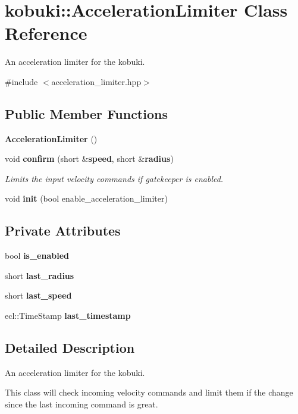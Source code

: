 \section{kobuki\-:\-:\-Acceleration\-Limiter \-Class \-Reference}
\label{classkobuki_1_1AccelerationLimiter}


\-An acceleration limiter for the kobuki.  




{\ttfamily \#include $<$acceleration\-\_\-limiter.\-hpp$>$}

\subsection*{\-Public \-Member \-Functions}
\begin{DoxyCompactItemize}
\item 
{\bf \-Acceleration\-Limiter} ()
\item 
void {\bf confirm} (short \&{\bf speed}, short \&{\bf radius})
\begin{DoxyCompactList}\small\item\em \-Limits the input velocity commands if gatekeeper is enabled. \end{DoxyCompactList}\item 
void {\bf init} (bool enable\-\_\-acceleration\-\_\-limiter)
\end{DoxyCompactItemize}
\subsection*{\-Private \-Attributes}
\begin{DoxyCompactItemize}
\item 
bool {\bf is\-\_\-enabled}
\item 
short {\bf last\-\_\-radius}
\item 
short {\bf last\-\_\-speed}
\item 
ecl\-::\-Time\-Stamp {\bf last\-\_\-timestamp}
\end{DoxyCompactItemize}


\subsection{\-Detailed \-Description}
\-An acceleration limiter for the kobuki. 

\-This class will check incoming velocity commands and limit them if the change since the last incoming command is great.

